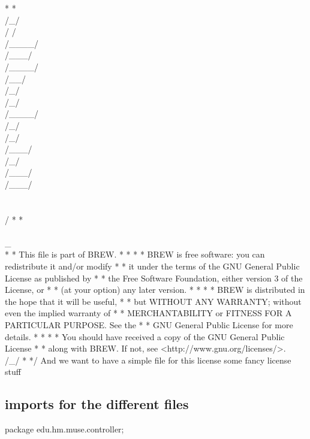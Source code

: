 \documentclass{llncs}%
\begin{document}
 *  *        \\/_/\\/ /\\/____/\\/___/ \\/____/\\/__/\\/_/ \\/_/\\/____/ \\/_/\\/_/    \\/___/  \\/_/\\/___/  \\/___/  \\ \\ \\/
 *  *                                                                                                    \\ \\_\\
 *  *    This file is part of BREW.
 *  *
 *  *    BREW is free software: you can redistribute it and/or modify
 *  *    it under the terms of the GNU General Public License as published by
 *  *    the Free Software Foundation, either version 3 of the License, or
 *  *    (at your option) any later version.
 *  *
 *  *    BREW is distributed in the hope that it will be useful,
 *  *    but WITHOUT ANY WARRANTY; without even the implied warranty of
 *  *    MERCHANTABILITY or FITNESS FOR A PARTICULAR PURPOSE.  See the
 *  *    GNU General Public License for more details.
 *  *
 *  *    You should have received a copy of the GNU General Public License
 *  *    along with BREW.  If not, see <http://www.gnu.org/licenses/>.                                                                                                  \\/_/
 *
 */
\nwendcode{}\nwdocspar
And we want to have a simple file for this license
\nwenddocs{}\endmoddef\nwstartdeflinemarkup\nwenddeflinemarkup
\LA{}some fancy license stuff~{\nwtagstyle{}}\RA{}
\nwendcode{}\nwdocspar
\subsection{imports for the different files}
\nwenddocs{}\endmoddef\nwstartdeflinemarkup{}\nwenddeflinemarkup
package edu.hm.muse.controller;
\end{document}
